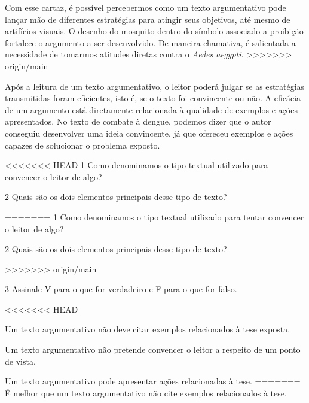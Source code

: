 {{Com esse cartaz, é possível percebermos como um texto argumentativo pode lançar mão de
diferentes estratégias para atingir seus objetivos, até mesmo de
artifícios visuais. O desenho do mosquito dentro do
símbolo associado a proibição fortalece o argumento a ser desenvolvido.
De maneira chamativa, é salientada a necessidade de tomarmos atitudes diretas contra o
\textit{Aedes aegypti}.
>>>>>>> origin/main

Após a leitura de um texto argumentativo, o leitor poderá julgar se as
estratégias transmitidas foram eficientes, isto é, se o texto foi
convincente ou não. A eficácia de um argumento está diretamente
relacionada à qualidade de exemplos e ações apresentados. No texto de
combate à dengue, podemos dizer que o autor conseguiu desenvolver uma
ideia convincente, já que ofereceu exemplos e ações capazes de
solucionar o problema exposto.}

\pagebreak
{}

<<<<<<< HEAD
\num{1} Como denominamos o tipo textual utilizado para convencer o leitor
de algo?


\num{2} Quais são os dois elementos principais desse tipo de texto?

=======
\num{1} Como denominamos o tipo textual utilizado para tentar convencer o leitor
de algo?


\num{2} Quais são os dois elementos principais desse tipo de texto?

>>>>>>> origin/main


\num{3} Assinale V para o que for verdadeiro e F para o que for falso.

\begin{boxlist}
<<<<<<< HEAD
\item Um texto argumentativo não deve citar exemplos relacionados à tese exposta. 

\item Um texto argumentativo não pretende convencer o leitor a respeito de 
um ponto de vista. 

\item Um texto argumentativo pode apresentar ações relacionadas à tese.  
=======
 É melhor que um texto argumentativo não cite exemplos relacionados à tese.


\end{boxlist}}
